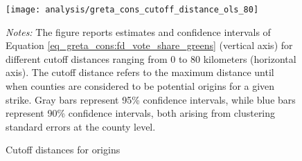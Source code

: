 \begin{figure}[H]\centering
	\caption{Cutoff distances for origins}\label{fig_greta_cons:origin_cutoff_distances}
	\texttt{[image: analysis/greta\_cons\_cutoff\_distance\_ols\_80]}
	\begin{minipage}{0.9\linewidth}
		\scriptsize{\emph{Notes:} The figure reports estimates and confidence intervals of Equation \ref{eq_greta_cons:fd_vote_share_greens} (vertical axis) for different cutoff distances ranging from 0 to 80 kilometers (horizontal axis). The cutoff distance refers to the maximum distance until when counties are considered to be potential origins for a given strike. Gray bars represent 95\% confidence intervals, while blue bars represent 90\% confidence intervals, both arising from clustering standard errors at the county level.}
	\end{minipage}
\end{figure}




